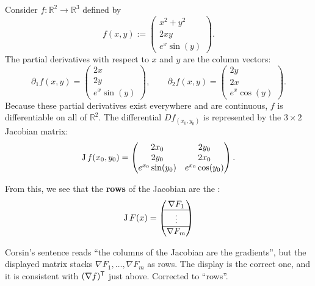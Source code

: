 \begin{example}
\label{ex:jacobian_vector_field}
Consider $f : \mathbb{R}^2 \to \mathbb{R}^3$ defined by
\[f(x,y) := \begin{pmatrix} x^2+y^2 \\ 2xy \\ e^x\sin(y) \end{pmatrix}.\]
The partial derivatives with respect to $x$ and $y$ are the column vectors:
\[\partial_1 f(x,y) = \begin{pmatrix} 2x \\ 2y \\ e^x\sin(y) \end{pmatrix}, \qquad \partial_2 f(x,y) = \begin{pmatrix} 2y \\ 2x \\ e^x\cos(y) \end{pmatrix}.\]
Because these partial derivatives exist everywhere and are continuous, $f$ is differentiable on all of $\mathbb{R}^2$. The differential $Df_{(x_0,y_0)}$ is represented by the $3 \times 2$ Jacobian matrix:
\[\operatorname{J} f(x_0,y_0) = \begin{pmatrix} 2x_0 & 2y_0 \\ 2y_0 & 2x_0 \\ e^{x_0}\sin(y_0) & e^{x_0}\cos(y_0) \end{pmatrix}.\]
\end{example}

From this, we see that the \textbf{rows} of the Jacobian are the 
:
\[\operatorname{J} F(x) = \begin{pmatrix} \nabla F_1 \\ \hline \vdots \\ \hline \nabla F_m \end{pmatrix}\]

\begin{ainote}
Corsin's sentence reads ``the columns of the Jacobian are the gradients'', but the displayed
matrix stacks $\nabla F_1, \dots, \nabla F_m$ as rows. The display is the correct one, and it is
consistent with $(\nabla f)^{\mathsf{T}}$ just above. Corrected to ``rows''.
\end{ainote}

